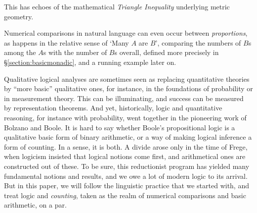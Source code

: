 \documentclass[12pt,oneside,reqno]{amsart}
\theoremstyle{definition}
\begin{document}
\noindent This has echoes of the mathematical \emph{Triangle Inequality} underlying metric geometry.

Numerical comparisons in natural language can even occur between \emph{proportions}, as happens in the relative sense of `Many $A$ are $B$', comparing the numbers of $B$s among the $A$s with the number of $B$s overall, defined more precisely in \S\ref{section:basicmonadic}, and a running example later on.

%
%
%
\vspace{1ex}

Qualitative logical analyses are sometimes  seen as replacing quantitative theories by ``more basic'' qualitative ones, for instance, in   the foundations of probability or in measurement theory. This can be illuminating, and  success  can be measured by  representation theorems.
And yet, historically, logic and quantitative reasoning, for instance with probability,  went together  in the pioneering work of  Bolzano and Boole. It is hard to say whether Boole's propositional logic is a qualitative basic form of binary arithmetic, or a way of  making logical inference a form of counting. In a sense, it is both. A  divide arose only in the time of Frege, when logicism insisted that logical notions come first, and arithmetical ones are constructed  out of these. To be sure, this  reductionist program has yielded many fundamental notions and results, and we owe a lot of modern logic to its arrival. But in this paper, we will follow the linguistic practice that we started with, and treat logic and \emph{counting}, taken as the realm of numerical comparisons and basic arithmetic, on a par. 
\end{document}
